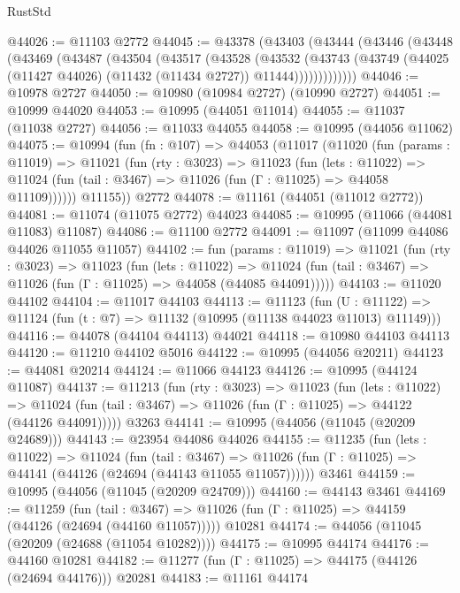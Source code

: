 \begin{lexlean}{RustStd}
\begin{coremodule}
@44026 := @11103 @2772
@44045 := @43378
    (@43403
      (@43444
        (@43446
          (@43448
            (@43469
              (@43487
                (@43504
                  (@43517
                    (@43528
                      (@43532
                        (@43743
                          (@43749
                            (@44025 (@11427 @44026) (@11432 (@11434 @2727)) @11444)))))))))))))
@44046 := @10978 @2727
@44050 := @10980 (@10984 @2727) (@10990 @2727)
@44051 := @10999 @44020
@44053 := @10995 (@44051 @11014)
@44055 := @11037 (@11038 @2727)
@44056 := @11033 @44055
@44058 := @10995 (@44056 @11062)
@44075 := @10994
    (fun (fn : @107) =>
    @44053
      (@11017
        (@11020
          (fun (params : @11019) =>
          @11021
            (fun (rty : @3023) =>
            @11023
              (fun (lets : @11022) =>
              @11024 (fun (tail : @3467) => @11026 (fun (Γ : @11025) => @44058 @11109))))))
        @11155))
    @2772
@44078 := @11161 (@44051 (@11012 @2772))
@44081 := @11074 (@11075 @2772) @44023
@44085 := @10995 (@11066 (@44081 @11083) @11087)
@44086 := @11100 @2772
@44091 := @11097 (@11099 @44086 @44026 @11055 @11057)
@44102 := fun (params : @11019) =>
  @11021
    (fun (rty : @3023) =>
    @11023
      (fun (lets : @11022) =>
      @11024 (fun (tail : @3467) => @11026 (fun (Γ : @11025) => @44058 (@44085 @44091)))))
@44103 := @11020 @44102
@44104 := @11017 @44103
@44113 := @11123
    (fun (U : @11122) => @11124 (fun (t : @7) => @11132 (@10995 (@11138 @44023 @11013) @11149)))
@44116 := @44078 (@44104 @44113) @44021
@44118 := @10980 @44103 @44113
@44120 := @11210 @44102 @5016
@44122 := @10995 (@44056 @20211)
@44123 := @44081 @20214
@44124 := @11066 @44123
@44126 := @10995 (@44124 @11087)
@44137 := @11213
    (fun (rty : @3023) =>
    @11023
      (fun (lets : @11022) =>
      @11024 (fun (tail : @3467) => @11026 (fun (Γ : @11025) => @44122 (@44126 @44091)))))
    @3263
@44141 := @10995 (@44056 (@11045 (@20209 @24689)))
@44143 := @23954 @44086 @44026
@44155 := @11235
    (fun (lets : @11022) =>
    @11024
      (fun (tail : @3467) =>
      @11026 (fun (Γ : @11025) => @44141 (@44126 (@24694 (@44143 @11055 @11057))))))
    @3461
@44159 := @10995 (@44056 (@11045 (@20209 @24709)))
@44160 := @44143 @3461
@44169 := @11259
    (fun (tail : @3467) => @11026 (fun (Γ : @11025) => @44159 (@44126 (@24694 (@44160 @11057)))))
    @10281
@44174 := @44056 (@11045 (@20209 (@24688 (@11054 @10282))))
@44175 := @10995 @44174
@44176 := @44160 @10281
@44182 := @11277 (fun (Γ : @11025) => @44175 (@44126 (@24694 @44176))) @20281
@44183 := @11161 @44174

\end{coremodule}
\end{lexlean}
